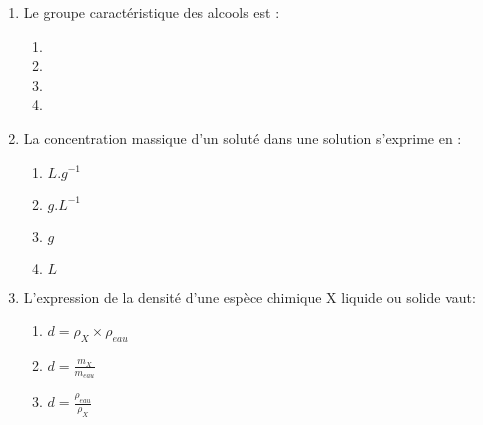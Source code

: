 \documentclass[12pt]{article}
\begin{document}
\begin{multicols}{2}
\begin{enumerate}
			\begin{enumerate}
				\item 2-méthylpropane
				\item 2-méthylpropan-1- ol
				\item 2-méthylbutan- 2- ol
					\item Butanol
			\end{enumerate}
		\item Le groupe caractéristique des alcools est : 
			\begin{enumerate}
				\item {}
				\item {}
				\item {}
				\item {}
			\end{enumerate}
	 \item  La concentration massique d'un soluté dans une solution s'exprime en :
	  \begin{enumerate}
		  \item $L.g^{-1}$
		  \item $g.L^{-1}$
		  \item $g$
		  \item $L$
	  \end{enumerate}

 \item  L'expression de la densité d'une espèce chimique X liquide ou solide vaut: 
	  \begin{enumerate}
		  \item $d = \rho_X \times \rho_{eau}$
		  \item $d = \frac{m_X }{m_{eau}}$
		  \item $d = \frac{\rho_{eau}}{\rho_{X}}$  
	  \end{enumerate}


	\end{enumerate}
\end{multicols}











\end{document}
